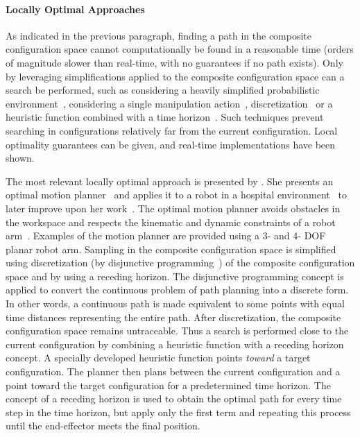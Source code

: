 \paragraph{Locally Optimal Approaches}
As indicated in the previous paragraph, finding a path in the composite configuration space cannot computationally be found in a reasonable time (orders of magnitude slower than real-time, with no guarantees if no path exists). Only by leveraging simplifications applied to the composite configuration space can a search be performed, such as considering a heavily simplified probabilistic environment~\cite{vandenberg_path_2009}, considering a single manipulation action~\cite{berenson_manipulation_2009}, discretization~\cite{sabbaghnovin_optimal_2016} or a heuristic function combined with a time horizon~\cite{sabbaghnovin_optimal_2016}. Such techniques prevent searching in configurations relatively far from the current configuration. Local optimality guarantees can be given, and real-time implementations have been shown.\bs

The most relevant locally optimal approach is presented by \citeauthor{sabbaghnovin_model_2021}. She presents an optimal motion planner~\cite{sabbaghnovin_optimal_2016} and applies it to a robot in a hospital environment~\cite{novin_dynamic_2018} to later improve upon her work~\cite{sabbaghnovin_model_2021}. The optimal motion planner avoids obstacles in the workspace and respects the kinematic and dynamic constraints of a robot arm~\cite{sabbaghnovin_optimal_2016}. Examples of the motion planner are provided using a 3- and 4- \ac{DOF} planar robot arm. Sampling in the composite configuration space is simplified using discretization (by disjunctive programming~\cite{_disjunctive_2018}) of the composite configuration space and by using a receding horizon. The disjunctive programming concept is applied to convert the continuous problem of path planning into a discrete form. In other words, a continuous path is made equivalent to some points with equal time distances representing the entire path. After discretization, the composite configuration space remains untraceable. Thus a search is performed close to the current configuration by combining a heuristic function with a receding horizon concept. A specially developed heuristic function points \textit{toward} a target configuration. The planner then plans between the current configuration and a point toward the target configuration for a predetermined time horizon. The concept of a receding horizon is used to obtain the optimal path for every time step in the time horizon, but apply only the first term and repeating this process until the end-effector meets the final position.\bs

